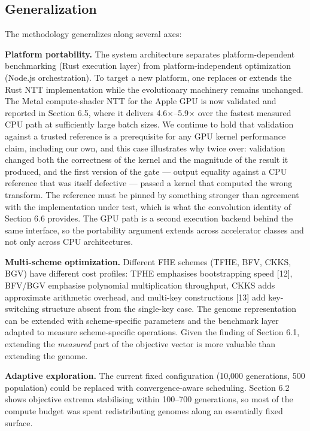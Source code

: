 \subsection{Generalization}\label{generalization}

The methodology generalizes along several axes:

\textbf{Platform portability.} The system architecture separates platform-dependent benchmarking (Rust execution layer) from platform-independent optimization (Node.js orchestration). To target a new platform, one replaces or extends the Rust NTT implementation while the evolutionary machinery remains unchanged. The Metal compute-shader NTT for the Apple GPU is now validated and reported in Section 6.5, where it delivers 4.6×--5.9× over the fastest measured CPU path at sufficiently large batch sizes. We continue to hold that validation against a trusted reference is a prerequisite for any GPU kernel performance claim, including our own, and this case illustrates why twice over: validation changed both the correctness of the kernel and the magnitude of the result it produced, and the first version of the gate --- output equality against a CPU reference that was itself defective --- passed a kernel that computed the wrong transform. The reference must be pinned by something stronger than agreement with the implementation under test, which is what the convolution identity of Section 6.6 provides. The GPU path is a second execution backend behind the same interface, so the portability argument extends across accelerator classes and not only across CPU architectures.

\textbf{Multi-scheme optimization.} Different FHE schemes (TFHE, BFV, CKKS, BGV) have different cost profiles: TFHE emphasises bootstrapping speed [12], BFV/BGV emphasise polynomial multiplication throughput, CKKS adds approximate arithmetic overhead, and multi-key constructions [13] add key-switching structure absent from the single-key case. The genome representation can be extended with scheme-specific parameters and the benchmark layer adapted to measure scheme-specific operations. Given the finding of Section 6.1, extending the \emph{measured} part of the objective vector is more valuable than extending the genome.

\textbf{Adaptive exploration.} The current fixed configuration (10,000 generations, 500 population) could be replaced with convergence-aware scheduling. Section 6.2 shows objective extrema stabilising within 100--700 generations, so most of the compute budget was spent redistributing genomes along an essentially fixed surface.

